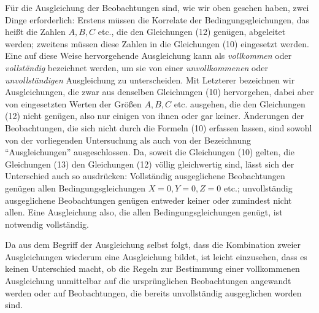 Für die Ausgleichung der Beobachtungen sind, wie wir oben gesehen haben, zwei Dinge erforderlich: Erstens müssen die Korrelate der Bedingungsgleichungen, das heißt die Zahlen \(A,B,C\) etc., die den Gleichungen (12) genügen, abgeleitet werden; zweitens müssen diese Zahlen in die Gleichungen (10) eingesetzt werden. Eine auf diese Weise hervorgehende Ausgleichung kann als \textit{vollkommen} oder \textit{vollständig} bezeichnet werden, um sie von einer \textit{unvollkommenen} oder \textit{unvollständigen} Ausgleichung zu unterscheiden. Mit Letzterer bezeichnen wir Ausgleichungen, die zwar aus denselben Gleichungen (10) hervorgehen, dabei aber von eingesetzten Werten der Größen \(A,B,C\) etc. ausgehen, die den Gleichungen (12) nicht genügen, also nur einigen von ihnen oder gar keiner. Änderungen der Beobachtungen, die sich nicht durch die Formeln (10) erfassen lassen, sind sowohl von der vorliegenden Untersuchung als auch von der Bezeichnung “Ausgleichungen” ausgeschlossen. Da, soweit die Gleichungen (10) gelten, die Gleichungen (13) den Gleichungen (12) völlig gleichwertig sind, lässt sich der Unterschied auch so ausdrücken: 
Vollständig ausgeglichene Beobachtungen genügen allen Bedingungsgleichungen \(X=0,\allowbreak Y=0,\allowbreak Z=0\) etc.; unvollständig ausgeglichene Beobachtungen genügen entweder keiner oder zumindest nicht allen. Eine Ausgleichung also, die allen Bedingungsgleichungen genügt, ist notwendig vollständig.

Da aus dem Begriff der Ausgleichung selbst folgt, dass die Kombination zweier Ausgleichungen wiederum eine Ausgleichung bildet, ist leicht einzusehen, dass es keinen Unterschied macht, ob die Regeln zur Bestimmung einer vollkommenen Ausgleichung unmittelbar auf die ursprünglichen Beobachtungen angewandt werden oder auf Beobachtungen, die bereits unvollständig ausgeglichen worden sind.

